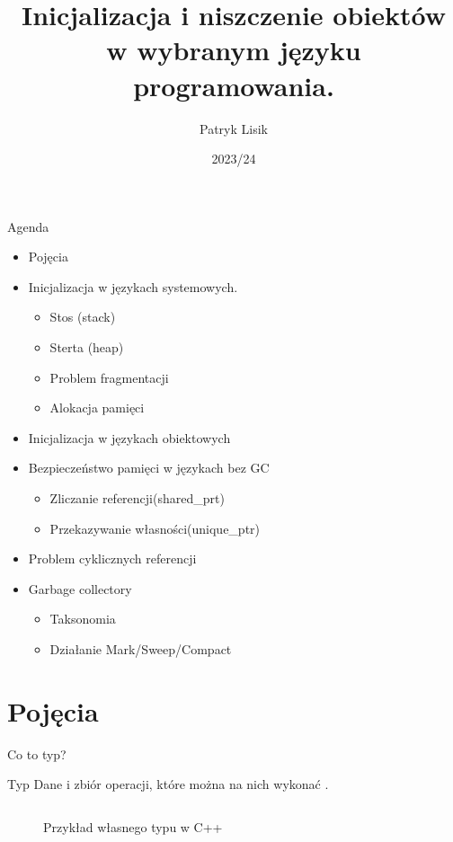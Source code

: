 \documentclass{beamer}
\title[Cykl życia obiektów]{Inicjalizacja i niszczenie obiektów w wybranym języku programowania.} %
\author{Patryk Lisik} %
\institute[] %
{
 Uniwersytet Łódzki \\ %
}
\date{2023/24} %
\begin{document}
\begin{frame}
\titlepage
\end{frame}

\begin{frame}{Agenda}
    \begin{itemize}
        \item Pojęcia
        \item  Inicjalizacja w językach systemowych. 
            \begin{itemize}
                \item Stos (stack)
                \item Sterta (heap)
                \item Problem fragmentacji
                \item Alokacja pamięci
            \end{itemize}
        \item Inicjalizacja w językach obiektowych
        \item Bezpieczeństwo pamięci w językach bez GC
            \begin{itemize}
                \item Zliczanie referencji(shared\_prt)
                \item Przekazywanie własności(unique\_ptr)
            \end{itemize}
        \item Problem cyklicznych referencji
        \item Garbage collectory 
            \begin{itemize}
                    \item Taksonomia
                    \item Działanie Mark/Sweep/Compact
                
            \end{itemize}

    \end{itemize}
\end{frame}

\section{Pojęcia}

\begin{frame}[containsverbatim]{Co to typ?}
    \begin{block}{Typ}
        Dane i zbiór operacji, które można na nich wykonać \cite{IBM-What-is-type}.
    \end{block}
    \begin{figure}
        \centering
        \inputminted{cpp}{./LineFunc.cpp}
    \caption{Przykład własnego typu w C++}
        \label{fig:cpp-operator-oveerload}
    \end{figure}

\end{frame}
\end{document}
